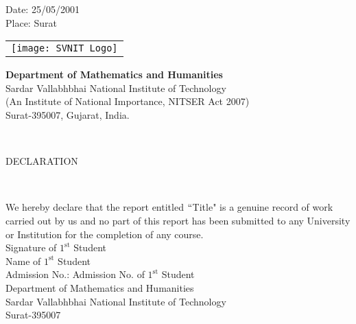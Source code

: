 \documentclass[11pt,a4paper]{report}
\begin{document}
Date: 25/05/2001 \\
Place: Surat



\newpage


\begin{minipage}{0.3\linewidth}
\begin{tabular}{r}
\texttt{[image: SVNIT Logo]}
\end{tabular}
\end{minipage}
\begin{minipage}{0.7\linewidth}
\begin{center}
\begin{large}
\textbf{Department of Mathematics and Humanities} \\
Sardar Vallabhbhai National Institute of Technology \\
(An Institute of National Importance, NITSER Act 2007) \\
Surat-395007, Gujarat, India.
\end{large}
\end{center}
\end{minipage}

\begin{center}
\hrulefill \\
\vspace*{-0.5cm}

\hrulefill
\end{center}

\begin{center}
{\color{blue} \begin{large}
DECLARATION
\end{large}} \\[1\baselineskip]
\end{center}

We hereby declare that the report entitled $``${\color{red}Title}" is a genuine record of work carried out by us and no part of this report has been submitted to any University or Institution for the completion of any course. \\[2\baselineskip]


{\color{red} Signature of $1^{\text{st}}$ Student} \\
{\color{red} Name of $1^{\text{st}}$ Student} \\
Admission No.: {\color{red} Admission No. of $1^{\text{st}}$ Student} \\
Department of Mathematics and Humanities \\
Sardar Vallabhbhai National Institute of Technology \\
Surat-395007 \\[1\baselineskip]
\end{document}
